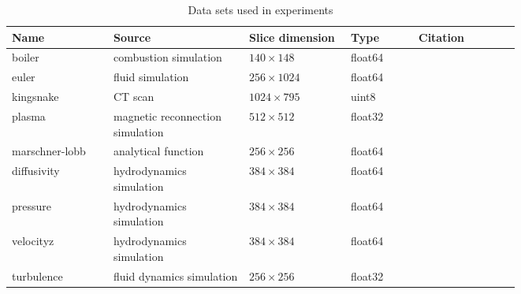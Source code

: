 \begin{table}[t]
  \caption{Data sets used in experiments}
  \centering
  \begin{tabular}{p{0.15\linewidth}p{0.20\linewidth}p{0.15\linewidth}p{0.10\linewidth}p{0.15\linewidth}}
  \hline
  Name & Source & Slice dimension & Type & Citation\\
  \hline
  boiler & combustion simulation& $140\times 148$ & float64 &\\
  euler & fluid simulation& $256\times 1024$ & float64 &\\
  kingsnake & CT scan & $1024\times 795$ & uint8 &\\
  plasma & magnetic reconnection simulation& $512\times 512$ & float32 &\\
  marschner-lobb & analytical function& $256\times 256$ & float64 &\\
  diffusivity & hydrodynamics simulation& $384\times 384$ & float64 &\\
  pressure & hydrodynamics simulation& $384\times 384$ & float64 &\\
  velocityz & hydrodynamics simulation& $384\times 384$ & float64 &\\
  turbulence & fluid dynamics simulation& $256\times 256$ & float32 &\\
  \hline
  \end{tabular}
\label{tbl:data-sets}
\end{table}